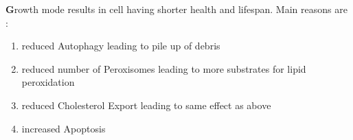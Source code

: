 \textbf Growth mode results in cell having shorter health and lifespan. Main reasons are :
\begin{enumerate}
\item reduced Autophagy leading to pile up of debris
\item reduced number of Peroxisomes leading to more substrates for lipid peroxidation
\item reduced Cholesterol Export leading to same effect as above
\item increased Apoptosis
\end{enumerate}